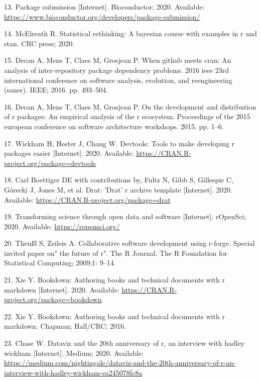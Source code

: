 \documentclass[10pt,letterpaper]{article}
\begin{document}
\leavevmode\hypertarget{ref-biocpkgsub2020}{}%
13. Package submission {[}Internet{]}. Bioconductor; 2020. Available:
\url{https://www.bioconductor.org/developers/package-submission/}

\leavevmode\hypertarget{ref-mcelreath2020}{}%
14. McElreath R. Statistical rethinking: A bayesian course with examples
in r and stan. CRC press; 2020.

\leavevmode\hypertarget{ref-decan2016}{}%
15. Decan A, Mens T, Claes M, Grosjean P. When github meets cran: An
analysis of inter-repository package dependency problems. 2016 ieee 23rd
international conference on software analysis, evolution, and
reengineering (saner). IEEE; 2016. pp. 493--504.

\leavevmode\hypertarget{ref-decan2015}{}%
16. Decan A, Mens T, Claes M, Grosjean P. On the development and
distribution of r packages: An empirical analysis of the r ecosystem.
Proceedings of the 2015 european conference on software architecture
workshops. 2015. pp. 1--6.

\leavevmode\hypertarget{ref-devtools}{}%
17. Wickham H, Hester J, Chang W. Devtools: Tools to make developing r
packages easier {[}Internet{]}. 2020. Available:
\url{https://CRAN.R-project.org/package=devtools}

\leavevmode\hypertarget{ref-drat}{}%
18. Carl Boettiger DE with contributions by, Fultz N, Gibb S, Gillespie
C, Górecki J, Jones M, et al. Drat: 'Drat' r archive template
{[}Internet{]}. 2020. Available:
\url{https://CRAN.R-project.org/package=drat}

\leavevmode\hypertarget{ref-ropensci2020}{}%
19. Transforming science through open data and software {[}Internet{]}.
rOpenSci; 2020. Available: \url{https://ropensci.org/}

\leavevmode\hypertarget{ref-theussl2009}{}%
20. Theußl S, Zeileis A. Collaborative software development using
r-forge. Special invited paper on" the future of r". The R Journal. The
R Foundation for Statistical Computing; 2009;1: 9--14.

\leavevmode\hypertarget{ref-bookdown}{}%
21. Xie Y. Bookdown: Authoring books and technical documents with r
markdown {[}Internet{]}. 2020. Available:
\url{https://CRAN.R-project.org/package=bookdown}

\leavevmode\hypertarget{ref-xie2016}{}%
22. Xie Y. Bookdown: Authoring books and technical documents with r
markdown. Chapman; Hall/CRC; 2016.

\leavevmode\hypertarget{ref-chase2020}{}%
23. Chase W. Dataviz and the 20th anniversary of r, an interview with
hadley wickham {[}Internet{]}. Medium; 2020. Available:
\url{https://medium.com/nightingale/dataviz-and-the-20th-anniversary-of-r-an-interview-with-hadley-wickham-ea245078fc8a}
\end{document}
